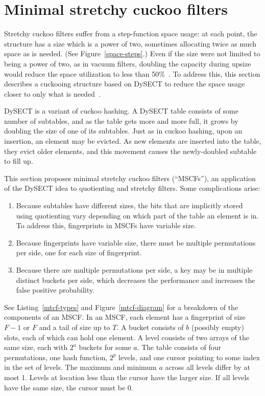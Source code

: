 \documentclass[letterpaper,twocolumn,10pt]{article}
\newcommand{\taffy}{stretchy}
\newcommand{\Taffy}{Stretchy}
\newcommand{\MTCF}{MSCF}
\newcommand{\taffy}{taffy}
\newcommand{\Taffy}{Taffy}
\newcommand{\MTCF}{MTCF}
\begin{document}


\section{Minimal \taffy{} cuckoo filters}
\label{mtcf}

\Taffy{} cuckoo filters suffer from a step-function space usage:
at each point, the structure has a size which is a power of two, sometimes allocating twice as much space as is needed. (See Figure~\ref{space-steps}.)
Even if the size were not limited to being a power of two, as in vacuum filters, doubling the capacity during upsize would reduce the space utilization to less than 50\%~\cite{vacuum}.
To address this, this section describes a cuckooing structure based on DySECT to reduce the space usage closer to only what is needed~\cite{dysect}.

DySECT is a variant of cuckoo hashing.
A DySECT table consists of some number of subtables, and as the table gets more and more full, it grows by doubling the size of one of its subtables.
Just as in cuckoo hashing, upon an insertion, an element may be evicted.
As new elements are inserted into the table, they evict older elements, and this movement causes the newly-doubled subtable to fill up.

This section proposes minimal \taffy{} cuckoo filters (``\MTCF{}s''), an application of the DySECT idea to quotienting and \taffy{} filters.
Some complications arise:

\begin{enumerate}
  \item Because subtables have different sizes, the bits that are implicitly stored using quotienting vary depending on which part of the table an element is in.
    To address this, fingerprints in \MTCF{}s have variable size.
  \item Because fingerprints have variable size, there must be multiple permutations per side, one for each size of fingerprint.
  \item Because there are multiple permutations per side, a key may be in multiple distinct buckets per side, which decreases the performance and increases the false positive probability.
\end{enumerate}

See Listing~\ref{mtcf-types} and Figure~\ref{mtcf-diagram} for a breakdown of the components of an \MTCF{}.
In an \MTCF{}, each element has a fingerprint of size $F-1$ or $F$ and a tail of size up to $T$.
A bucket consists of $b$ (possibly empty) slots, each of which can hold one element.
A level consists of two arrays of the same size, each with $2^a$ buckets for some $a$.
The table consists of four permutations, one hash function, $2^p$ levels, and one cursor pointing to some index in the set of levels.
The maximum and minimum $a$ across all levels differ by at most 1.
Levels at location less than the cursor have the larger size.
If all levels have the same size, the cursor must be 0.
\end{document}
